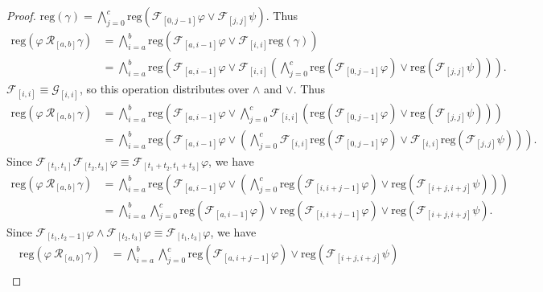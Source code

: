 \documentclass[runningheads]{llncs}
\renewcommand{\phi}{\varphi}
\begin{document}
\begin{proof}
$\text{reg}\left(\gamma\right) = \bigwedge_{j=0}^{c} \text{reg}\left(\mathcal{F}_{[0,j-1]}\phi \lor \mathcal{F}_{[j, j]}\psi\right)$. Thus
\begin{align*}
\text{reg}\left(\phi \ \mathcal{R}_{[a,b]}\gamma\right) &= \bigwedge_{i=a}^{b} \text{reg}\left(\mathcal{F}_{[a,i-1]}\phi \lor \mathcal{F}_{[i, i]}\text{reg}\left(\gamma\right)\right)\\
&= \bigwedge_{i=a}^{b} \text{reg}\left(\mathcal{F}_{[a,i-1]}\phi \lor  \mathcal{F}_{[i, i]}\left( \bigwedge_{j=0}^{c} \text{reg}\left(\mathcal{F}_{[0,j-1]}\phi\right) \lor \text{reg}\left(\mathcal{F}_{[j, j]}\psi\right) \right) \right).
\end{align*}
$\mathcal{F}_{[i, i]} \equiv \mathcal{G}_{[i, i]}$, so this operation distributes over $\land$ and $\lor$. Thus
\begin{align*}
\text{reg}\left(\phi \ \mathcal{R}_{[a,b]}\gamma\right) &= \bigwedge_{i=a}^{b} \text{reg}\left(\mathcal{F}_{[a,i-1]}\phi \lor  \bigwedge_{j=0}^{c} \mathcal{F}_{[i, i]}\left( \text{reg}\left(\mathcal{F}_{[0,j-1]}\phi\right) \lor \text{reg}\left(\mathcal{F}_{[j, j]}\psi\right) \right) \right) \\
&= \bigwedge_{i=a}^{b} \text{reg}\left(\mathcal{F}_{[a,i-1]}\phi \lor \left( \bigwedge_{j=0}^{c} \mathcal{F}_{[i, i]}\text{reg}\left(\mathcal{F}_{[0,j-1]}\phi\right) \lor \mathcal{F}_{[i, i]}\text{reg}\left(\mathcal{F}_{[j, j]}\psi \right) \right) \right).
\end{align*}
Since $\mathcal{F}_{[t_1,t_1]}\mathcal{F}_{[t_2,t_3]} \phi \equiv \mathcal{F}_{[t_1+t_2,t_1+t_3]} \phi$, we have
\begin{align*}
\text{reg}\left(\phi \ \mathcal{R}_{[a,b]}\gamma\right) &= \bigwedge_{i=a}^{b} \text{reg}\left(\mathcal{F}_{[a,i-1]}\phi \lor \left( \bigwedge_{j=0}^{c} \text{reg}\left(\mathcal{F}_{[i,i+j-1]}\phi\right) \lor \text{reg}\left(\mathcal{F}_{[i+j, i+j]}\psi \right) \right) \right) \\
&= \bigwedge_{i=a}^{b}  \bigwedge_{j=0}^{c} \text{reg}\left(\mathcal{F}_{[a,i-1]}\phi\right) \lor  \text{reg}\left(\mathcal{F}_{[i,i+j-1]}\phi\right) \lor \text{reg}\left(\mathcal{F}_{[i+j, i+j]}\psi \right).
\end{align*}
Since $\mathcal{F}_{[t_1,t_2-1]} \phi \land \mathcal{F}_{[t_2,t_3]} \phi \equiv \mathcal{F}_{[t_1, t_3]} \phi$, we have
\begin{align*}
\text{reg}\left(\phi \ \mathcal{R}_{[a,b]}\gamma\right) &= \bigwedge_{i=a}^{b}  \bigwedge_{j=0}^{c} \text{reg}\left(\mathcal{F}_{[a,i+j-1]}\phi\right) \lor \text{reg}\left(\mathcal{F}_{[i+j, i+j]}\psi  \right) \\

\end{align*}
\end{proof}
\end{document}
